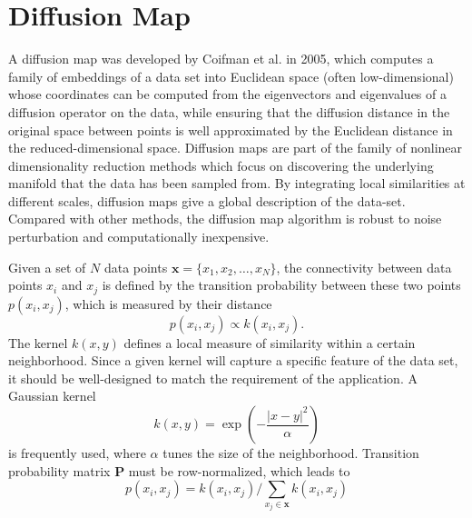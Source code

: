\section{Diffusion Map\label{Sec:DR:DM}}
A diffusion map was developed by Coifman et al. in 2005\cite{CoifmanPNAS2005a,CoifmanPNAS2005b,CoifmanACHA2006}, which computes a family of embeddings of a data set into Euclidean space (often low-dimensional) whose coordinates can be computed from the eigenvectors and eigenvalues of a diffusion operator on the data, while ensuring that the diffusion distance in the original space between points is well approximated by the Euclidean distance in the reduced-dimensional space. Diffusion maps are part of the family of nonlinear dimensionality reduction methods which focus on discovering the underlying manifold that the data has been sampled from. By integrating local similarities at different scales, diffusion maps give a global description of the data-set. Compared with other methods, the diffusion map algorithm is robust to noise perturbation and computationally inexpensive.

Given a set of $N$ data points $\mathbf{x}=\{x_1, x_2,\dots,x_N\}$, the connectivity between data points $x_i$ and $x_j$ is defined by the transition probability between these two points $p(x_i,x_j)$, which is measured by their distance
\begin{equation}
	p(x_i,x_j)\propto k(x_i,x_j).
\end{equation}
The kernel $k(x,y)$ defines a local measure of similarity within a certain neighborhood. Since a given kernel will capture a specific feature of the data set, it should be well-designed to match the requirement of the application. A Gaussian kernel
\begin{equation}
	k(x,y)=\exp{\left(-\frac{|x-y|^2}{\alpha}\right)}
\end{equation}
is frequently used, where $\alpha$ tunes the size of the neighborhood. Transition probability matrix $\mathbf{P}$ must be row-normalized, which leads to
\begin{equation}
	p(x_i,x_j)= k(x_i,x_j)/\sum\limits_{x_j\in \mathbf{x}}k(x_i,x_j)
\end{equation}
 

